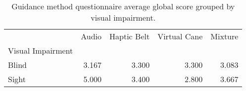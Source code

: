 
\begin{table}[!htb]
\centering
\caption{Guidance method questionnaire average global score grouped by visual impairment.}
\label{tab:questionnaire_average_group}
\begin{tabular}{lrrrr}
\toprule
{} &  Audio &  Haptic Belt &  Virtual Cane &  Mixture \\
Visual Impairment &        &              &               &          \\
\midrule
Blind             &  3.167 &        3.300 &         3.300 &    3.083 \\
Sight             &  5.000 &        3.400 &         2.800 &    3.667 \\
\bottomrule
\end{tabular}
\end{table}

